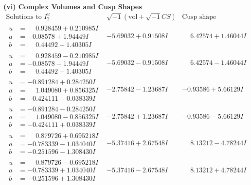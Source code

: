\documentclass[1p]{elsarticle_modified}
\theoremstyle{definition}
\newcommand{\I}{\sqrt{-1}}
\begin{document}
\newpage\flushleft \textbf{(vi) Complex Volumes and Cusp Shapes}
$$\begin{array}{c|c|c}  
\text{Solutions to }I^u_{2}& \I (\text{vol} + \sqrt{-1}CS) & \text{Cusp shape}\\
 \hline 
\begin{aligned}
u &= \phantom{-}0.928459 + 0.210985 I \\
a &= -0.08578 + 1.94449 I \\
b &= \phantom{-}0.44492 + 1.40305 I\end{aligned}
 & -5.69032 + 0.91508 I & \phantom{-}6.42574 + 1.46044 I \\ \hline\begin{aligned}
u &= \phantom{-}0.928459 - 0.210985 I \\
a &= -0.08578 - 1.94449 I \\
b &= \phantom{-}0.44492 - 1.40305 I\end{aligned}
 & -5.69032 - 0.91508 I & \phantom{-}6.42574 - 1.46044 I \\ \hline\begin{aligned}
u &= -0.891284 + 0.284250 I \\
a &= \phantom{-}1.049080 + 0.856325 I \\
b &= -0.424111 - 0.038339 I\end{aligned}
 & -2.75842 - 1.23687 I & -0.93586 + 5.66129 I \\ \hline\begin{aligned}
u &= -0.891284 - 0.284250 I \\
a &= \phantom{-}1.049080 - 0.856325 I \\
b &= -0.424111 + 0.038339 I\end{aligned}
 & -2.75842 + 1.23687 I & -0.93586 - 5.66129 I \\ \hline\begin{aligned}
u &= \phantom{-}0.879726 + 0.695218 I \\
a &= -0.783339 - 1.034040 I \\
b &= -0.251596 - 1.308430 I\end{aligned}
 & -5.37416 + 2.67548 I & \phantom{-}8.13212 - 4.78244 I \\ \hline\begin{aligned}
u &= \phantom{-}0.879726 - 0.695218 I \\
a &= -0.783339 + 1.034040 I \\
b &= -0.251596 + 1.308430 I\end{aligned}
 & -5.37416 - 2.67548 I & \phantom{-}8.13212 + 4.78244 I \\ \hline\begin{aligned}

\end{aligned}
\end{array}$$
\end{document}
